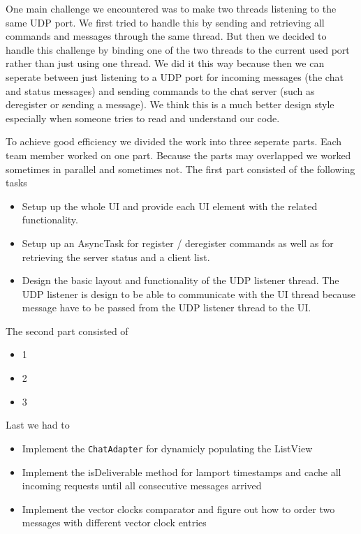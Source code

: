 \documentclass{report}
\begin{document}
One main challenge we encountered was to make two threads listening to the same UDP port. We first tried to handle this by sending and retrieving all commands and messages through the same thread. But then we decided to handle this challenge by binding one of the two threads to the current used port rather than just using one thread. We did it this way because then we can seperate between just listening to a UDP port for incoming messages (the chat and status messages) and sending commands to the chat server (such as deregister or sending a message). We think this is a much better design style especially when someone tries to read and understand our code.

To achieve good efficiency we divided the work into three seperate parts. Each team member worked on one part. Because the parts may overlapped we worked sometimes in parallel and sometimes not. The first part consisted of the following tasks
\begin{itemize}
  \item Setup up the whole UI and provide each UI element with the related functionality. 
  \item Setup up an AsyncTask for register / deregister commands as well as for retrieving the server status and a client list.
  \item Design the basic layout and functionality of the UDP listener thread. The UDP listener is design to be able to communicate with the UI thread because message have to be passed from the UDP listener thread to the UI.
\end{itemize}

The second part consisted of
\begin{itemize}
  \item 1
  \item 2
  \item 3
\end{itemize}

Last we had to
\begin{itemize}
  \item Implement the \texttt{ChatAdapter} for dynamicly populating the ListView
  \item Implement the isDeliverable method for lamport timestamps and cache all incoming requests until all consecutive messages arrived
  \item Implement the vector clocks comparator and figure out how to order two messages with different vector clock entries
\end{itemize}


\end{document}
